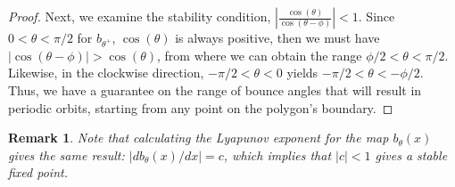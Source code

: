 \documentclass[letterpaper, 10 pt, conference]{ieeeconf}  %
\newtheorem{remark}{\bf Remark}
\begin{document}
\begin{proof}
Next, we examine the stability condition,
$|\frac{\cos(\theta)}{\cos(\theta-\phi)}| < 1$. 
Since $0 < \theta < \pi/2$ for $b_{\theta^+}$, $\cos(\theta)$ is always
positive, then we must have $|\cos(\theta-\phi)| > \cos(\theta)$, from where we 
can obtain the range $\phi/2 < \theta < \pi/2$. Likewise, in the clockwise 
direction, $-\pi/2 < \theta < 0$ yields $-\pi/2 <
\theta < -\phi/2$. Thus, we have a guarantee on the range of bounce angles that
will result in periodic orbits, starting from any point on the polygon's
boundary.
\end{proof}

\begin{remark}
Note that calculating the Lyapunov exponent \cite{jackson1992} for the map $b_{\theta}(x)$
gives the same result: $|db_{\theta}(x)/dx| = c$, which implies that $|c| < 1$
gives a stable fixed point.
\end{remark}
\end{document}
